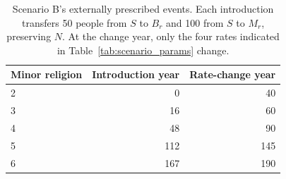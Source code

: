 \begin{table}[!htbp]\centering\small
\caption{Scenario B's externally prescribed events. Each introduction transfers 50 people from $S$ to $B_r$ and 100 from $S$ to $M_r$, preserving $N$. At the change year, only the four rates indicated in Table~\ref{tab:scenario_params} change.}\label{tab:schedules}
\begin{tabular}{lrr}\toprule Minor religion & Introduction year & Rate-change year\\\midrule
2 & 0 & 40\\
3 & 16 & 60\\
4 & 48 & 90\\
5 & 112 & 145\\
6 & 167 & 190\\
\bottomrule\end{tabular}\end{table}

